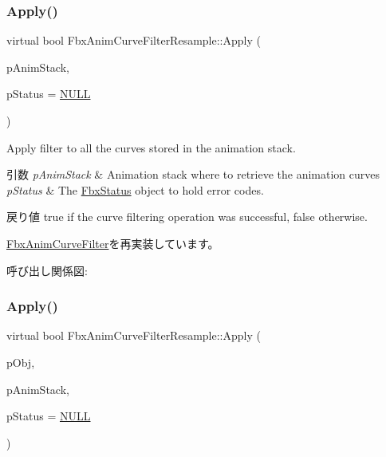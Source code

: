 \subsubsection{\texorpdfstring{Apply()}{Apply()}\hspace{0.1cm}{\footnotesize\ttfamily [1/5]}}
{\footnotesize\ttfamily virtual bool Fbx\+Anim\+Curve\+Filter\+Resample\+::\+Apply (\begin{DoxyParamCaption}\item[{\hyperlink{class_fbx_anim_stack}{Fbx\+Anim\+Stack} $\ast$}]{p\+Anim\+Stack,  }\item[{\hyperlink{class_fbx_status}{Fbx\+Status} $\ast$}]{p\+Status = {\ttfamily \hyperlink{fbxarch_8h_a070d2ce7b6bb7e5c05602aa8c308d0c4}{N\+U\+LL}} }\end{DoxyParamCaption})\hspace{0.3cm}{\ttfamily [virtual]}}

Apply filter to all the curves stored in the animation stack. 
\begin{DoxyParams}{引数}
{\em p\+Anim\+Stack} & Animation stack where to retrieve the animation curves \\
\hline
{\em p\+Status} & The \hyperlink{class_fbx_status}{Fbx\+Status} object to hold error codes. \\
\hline
\end{DoxyParams}
\begin{DoxyReturn}{戻り値}
{\ttfamily true} if the curve filtering operation was successful, {\ttfamily false} otherwise. 
\end{DoxyReturn}


\hyperlink{class_fbx_anim_curve_filter_aef3900e6180e05661c27ee484ae939c3}{Fbx\+Anim\+Curve\+Filter}を再実装しています。

呼び出し関係図\+:
\mbox{\label{class_fbx_anim_curve_filter_resample_a6f22a537869dc295ceff244f56ac561e}} 
\subsubsection{\texorpdfstring{Apply()}{Apply()}\hspace{0.1cm}{\footnotesize\ttfamily [2/5]}}
{\footnotesize\ttfamily virtual bool Fbx\+Anim\+Curve\+Filter\+Resample\+::\+Apply (\begin{DoxyParamCaption}\item[{\hyperlink{class_fbx_object}{Fbx\+Object} $\ast$}]{p\+Obj,  }\item[{\hyperlink{class_fbx_anim_stack}{Fbx\+Anim\+Stack} $\ast$}]{p\+Anim\+Stack,  }\item[{\hyperlink{class_fbx_status}{Fbx\+Status} $\ast$}]{p\+Status = {\ttfamily \hyperlink{fbxarch_8h_a070d2ce7b6bb7e5c05602aa8c308d0c4}{N\+U\+LL}} }\end{DoxyParamCaption})\hspace{0.3cm}{\ttfamily [virtual]}}

